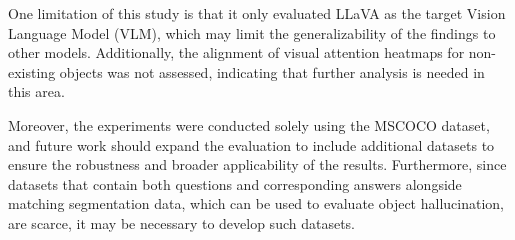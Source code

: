 One limitation of this study is that it only evaluated LLaVA as the target Vision Language Model (VLM), which may limit the generalizability of the findings to other models. Additionally, the alignment of visual attention heatmaps for non-existing objects was not assessed, indicating that further analysis is needed in this area. 

Moreover, the experiments were conducted solely using the MSCOCO dataset, and future work should expand the evaluation to include additional datasets to ensure the robustness and broader applicability of the results. Furthermore, since datasets that contain both questions and corresponding answers alongside matching segmentation data, which can be used to evaluate object hallucination, are scarce, it may be necessary to develop such datasets.
